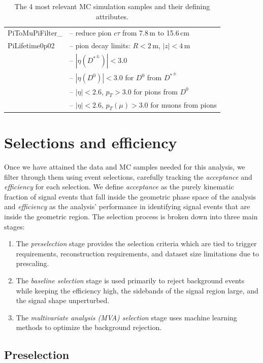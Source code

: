 \begin{table}
\begin{tabular}{|p{3.2cm}|p{12cm}|}
    PiToMuPiFilter\_ & -- reduce pion $c\tau$ from 7.8\,m to 15.6\,cm \\
    PiLifetime0p02 & -- pion decay limits: $R < 2$\,m, $|z| < 4$\,m \\
    & -- $|\eta({D^*}^\pm)| < 3.0$ \\
    & -- $|\eta(D^0)| < 3.0$ for $D^0$ from ${D^*}^\pm$ \\
    & -- $|\eta| < 2.6$, $p_T > 3.0$ for pions from $D^0$ \\
    & -- $|\eta| < 2.6$, $p_T(\mu) > 3.0$ for muons from pions \\
    \hline
\end{tabular}
\caption{The 4 most relevant MC simulation samples and their defining attributes.}
\label{tab:mc-samples}
\end{table}

\section{Selections and efficiency}
\label{sec:selections_and_efficency}

Once we have attained the data and MC samples needed for this analysis, we filter through them using event selections, carefully tracking the \textit{acceptance} and \textit{efficiency} for each selection. We define \textit{acceptance} as the purely kinematic fraction of signal events that fall inside the geometric phase space of the analysis and \textit{efficiency} as the analysis' performance in identifying signal events that are inside the geometric region. The selection process is broken down into three main stages:
\begin{enumerate}
    \item The \textit{preselection} stage provides the selection criteria which are tied to trigger requirements, reconstruction requirements, and dataset size limitations due to prescaling.
    \item The \textit{baseline selection} stage is used primarily to reject background events while keeping the efficiency high, the sidebands of the signal region large, and the signal shape unperturbed. 
    \item The \textit{multivariate analysis (MVA) selection} stage uses machine learning methods to optimize the background rejection.
\end{enumerate}

\subsection{Preselection}
\label{subsec:preselection}

